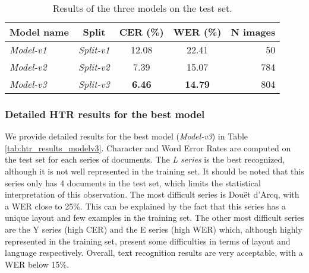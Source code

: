 \documentclass[runningheads]{llncs}
\begin{document}
\begin{table}[t]
    \centering
    \caption{Results of the three models on the test set.}
    \label{tab:models_by_split}
    \begin{tabular}{lcccr}
        \toprule
        \textbf{Model name} \phantom{-}& \textbf{Split} & \textbf{CER (\%)} & \textbf{WER (\%)} & \textbf{N images} \\
        \midrule
        \textit{Model-v1} & \textit{Split-v1} & 12.08 & 22.41 & 50 \\
        \textit{Model-v2} & \textit{Split-v2} & 7.39 & 15.07 & 784 \\
        \textit{Model-v3} & \textit{Split-v3} & \textbf{6.46} & \textbf{14.79} & 804 \\
        \bottomrule
    \end{tabular}
\end{table}

\subsubsection{Detailed HTR results for the best model}

We provide detailed results for the best model (\textit{Model-v3}) in Table \ref{tab:htr_results_modelv3}. Character and Word Error Rates are computed on the test set for each series of documents. 
The \textit{L series} is the best recognized, although it is not well represented in the training set. 
It should be noted that this series only has 4 documents in the test set, which limits the statistical interpretation of this observation.
The most difficult series is Douët d’Arcq, with a WER close to 25\%. This can be explained by the fact that this series has a unique layout and few examples in the training set. 
The other most difficult series are the Y series (high CER) and the E series (high WER) which, although highly represented in the training set, present some difficulties in terms of layout and language respectively.
Overall, text recognition results are very acceptable, with a WER below 15\%. 
\end{document}
